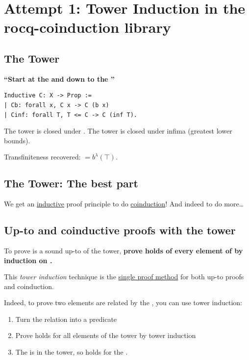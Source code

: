 \section{Attempt 1: Tower Induction in the rocq-coinduction
  library~\cite{pous-companion,schafer-smolka}}
\label{sec:tower}

\subsection{The Tower}

\textbf{``Start at the  and  down to the ''}

\begin{lstlisting}
Inductive C: X -> Prop :=
| Cb: forall x, C x -> C (b x)
| Cinf: forall T, T <= C -> C (inf T).
\end{lstlisting}

The tower is closed under . The tower is closed under infima (greatest
lower bounds).

Transfiniteness recovered:  $= b^{\lambda}(\top)$.


\subsection{The Tower: The best part}

We get an \underline{inductive} proof principle to do \underline{coinduction}!
And indeed to do more\ldots

\subsection{Up-to and coinductive proofs with the tower}

To prove  is a sound up-to of the tower, \textbf{prove  holds of
every element of  by induction on .}

This \emph{tower induction} technique is the \underline{single proof method} for
both up-to proofs and coinduction.

Indeed, to prove two elements are related by the , you can use tower
induction:
\begin{enumerate}
  \item Turn the relation into a predicate 
  \item Prove  holds for all elements of the tower by tower induction
  \item The  is in the tower, so  holds for the .
\end{enumerate}

